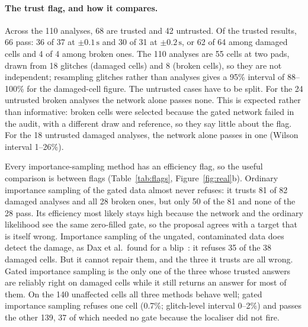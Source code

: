 \documentclass{openjournal}
\begin{document}
\paragraph{The trust flag, and how it compares.}
Across the 110 analyses, 68 are trusted and 42 untrusted.
Of the trusted results, 66 pass: 36 of 37 at $\pm0.1\,\mathrm{s}$ and 30 of 31 at $\pm0.2\,\mathrm{s}$, or 62 of 64 among damaged cells and 4 of 4 among broken ones.
The 110 analyses are 55 cells at two pads, drawn from 18 glitches (damaged cells) and 8 (broken cells), so they are not independent; resampling glitches rather than analyses gives a 95\% interval of 88--100\% for the damaged-cell figure.
The untrusted cases have to be split.
For the 24 untrusted broken analyses the network alone passes none. This is expected rather than informative: broken cells were selected because the gated network failed in the audit, with a different draw and reference, so they say little about the flag.
For the 18 untrusted damaged analyses, the network alone passes in one (Wilson interval 1--26\%).

Every importance-sampling method has an efficiency flag, so the useful comparison is between flags (Table~\ref{tab:flags}, Figure~\ref{fig:real}b).
Ordinary importance sampling of the gated data almost never refuses: it trusts 81 of 82 damaged analyses and all 28 broken ones, but only 50 of the 81 and none of the 28 pass.
Its efficiency most likely stays high because the network and the ordinary likelihood see the same zero-filled gate, so the proposal agrees with a target that is itself wrong.
Importance sampling of the ungated, contaminated data does detect the damage, as Dax et al.\ found for a blip~\cite{Dax2023is}: it refuses 35 of the 38 damaged cells.
But it cannot repair them, and the three it trusts are all wrong.
Gated importance sampling is the only one of the three whose trusted answers are reliably right on damaged cells while it still returns an answer for most of them.
On the 140 unaffected cells all three methods behave well; gated importance sampling refuses one cell (0.7\%; glitch-level interval 0--2\%) and passes the other 139, 37 of which needed no gate because the localiser did not fire.
\end{document}
